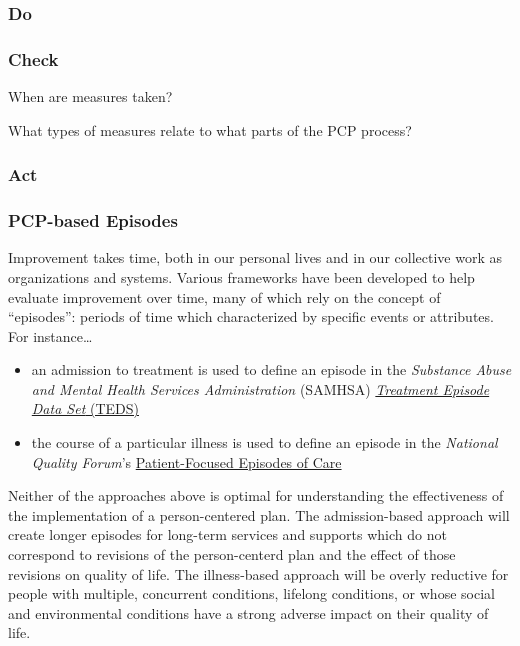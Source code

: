 \documentclass[
]{book}
\providecommand{\tightlist}{%
  \setlength{\itemsep}{0pt}\setlength{\parskip}{0pt}}
\begin{document}
\hypertarget{do}{%
\subsubsection{Do}\label{do}}

\hypertarget{check}{%
\subsubsection{Check}\label{check}}

When are measures taken?

What types of measures relate to what parts of the PCP process?

\hypertarget{act}{%
\subsubsection{Act}\label{act}}

\hypertarget{pcp-based-episodes}{%
\subsubsection{PCP-based Episodes}\label{pcp-based-episodes}}

Improvement takes time, both in our personal lives and in our collective work as organizations and systems. Various frameworks have been developed to help evaluate improvement over time, many of which rely on the concept of ``episodes'': periods of time which characterized by specific events or attributes. For instance\ldots{}

\begin{itemize}
\tightlist
\item
  an admission to treatment is used to define an episode in the \emph{Substance Abuse and Mental Health Services Administration} (SAMHSA) \href{https://www.samhsa.gov/data/data-we-collect/teds-treatment-episode-data-set}{\emph{Treatment Episode Data Set} (TEDS)}
\item
  the course of a particular illness is used to define an episode in the \emph{National Quality Forum}'s \href{https://www.qualityforum.org/Publications/2010/01/Measurement_Framework__Evaluating_Efficiency_Across_Patient-Focused_Episodes_of_Care.aspx}{Patient-Focused Episodes of Care}
\end{itemize}

Neither of the approaches above is optimal for understanding the effectiveness of the implementation of a person-centered plan. The admission-based approach will create longer episodes for long-term services and supports which do not correspond to revisions of the person-centerd plan and the effect of those revisions on quality of life. The illness-based approach will be overly reductive for people with multiple, concurrent conditions, lifelong conditions, or whose social and environmental conditions have a strong adverse impact on their quality of life.
\end{document}
